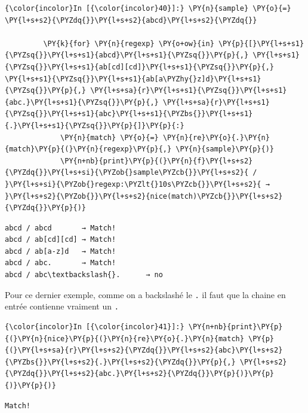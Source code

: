     \begin{Verbatim}[commandchars=\\\{\}]
{\color{incolor}In [{\color{incolor}40}]:} \PY{n}{sample} \PY{o}{=} \PY{l+s+s2}{\PYZdq{}}\PY{l+s+s2}{abcd}\PY{l+s+s2}{\PYZdq{}}
         
         \PY{k}{for} \PY{n}{regexp} \PY{o+ow}{in} \PY{p}{[}\PY{l+s+s1}{\PYZsq{}}\PY{l+s+s1}{abcd}\PY{l+s+s1}{\PYZsq{}}\PY{p}{,} \PY{l+s+s1}{\PYZsq{}}\PY{l+s+s1}{ab[cd][cd]}\PY{l+s+s1}{\PYZsq{}}\PY{p}{,} \PY{l+s+s1}{\PYZsq{}}\PY{l+s+s1}{ab[a\PYZhy{}z]d}\PY{l+s+s1}{\PYZsq{}}\PY{p}{,} \PY{l+s+sa}{r}\PY{l+s+s1}{\PYZsq{}}\PY{l+s+s1}{abc.}\PY{l+s+s1}{\PYZsq{}}\PY{p}{,} \PY{l+s+sa}{r}\PY{l+s+s1}{\PYZsq{}}\PY{l+s+s1}{abc}\PY{l+s+s1}{\PYZbs{}}\PY{l+s+s1}{.}\PY{l+s+s1}{\PYZsq{}}\PY{p}{]}\PY{p}{:}
             \PY{n}{match} \PY{o}{=} \PY{n}{re}\PY{o}{.}\PY{n}{match}\PY{p}{(}\PY{n}{regexp}\PY{p}{,} \PY{n}{sample}\PY{p}{)}
             \PY{n+nb}{print}\PY{p}{(}\PY{n}{f}\PY{l+s+s2}{\PYZdq{}}\PY{l+s+si}{\PYZob{}sample\PYZcb{}}\PY{l+s+s2}{ / }\PY{l+s+si}{\PYZob{}regexp:\PYZlt{}10s\PYZcb{}}\PY{l+s+s2}{ → }\PY{l+s+s2}{\PYZob{}}\PY{l+s+s2}{nice(match)\PYZcb{}}\PY{l+s+s2}{\PYZdq{}}\PY{p}{)}
\end{Verbatim}


    \begin{Verbatim}[commandchars=\\\{\}]
abcd / abcd       → Match!
abcd / ab[cd][cd] → Match!
abcd / ab[a-z]d   → Match!
abcd / abc.       → Match!
abcd / abc\textbackslash{}.      → no

    \end{Verbatim}

    Pour ce dernier exemple, comme on a backslashé le \texttt{.} il faut que
la chaine en entrée contienne vraiment un \texttt{.}

    \begin{Verbatim}[commandchars=\\\{\}]
{\color{incolor}In [{\color{incolor}41}]:} \PY{n+nb}{print}\PY{p}{(}\PY{n}{nice}\PY{p}{(}\PY{n}{re}\PY{o}{.}\PY{n}{match} \PY{p}{(}\PY{l+s+sa}{r}\PY{l+s+s2}{\PYZdq{}}\PY{l+s+s2}{abc}\PY{l+s+s2}{\PYZbs{}}\PY{l+s+s2}{.}\PY{l+s+s2}{\PYZdq{}}\PY{p}{,} \PY{l+s+s2}{\PYZdq{}}\PY{l+s+s2}{abc.}\PY{l+s+s2}{\PYZdq{}}\PY{p}{)}\PY{p}{)}\PY{p}{)}
\end{Verbatim}


    \begin{Verbatim}[commandchars=\\\{\}]
Match!

    \end{Verbatim}

